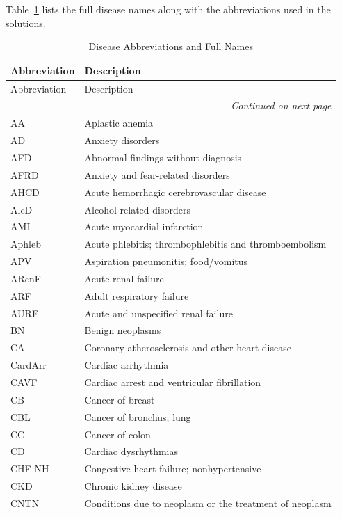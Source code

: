 Table~\ref{tab.abb} lists the full disease names along with the abbreviations used in the solutions.
{\scriptsize
\begin{longtable}{ll}

\toprule
{Abbreviation} & {Description} \\
\midrule
\endfirsthead

\toprule
{Abbreviation} & {Description} \\
\midrule
\endhead

\midrule
\multicolumn{2}{r}{\textit{Continued on next page}} \\
\endfoot

\bottomrule
\caption{\label{tab.abb} \normalsize{Disease Abbreviations and Full Names}}

\endlastfoot

AA & Aplastic anemia \\
AD & Anxiety disorders \\
AFD & Abnormal findings without diagnosis \\
AFRD & Anxiety and fear-related disorders \\
AHCD & Acute hemorrhagic cerebrovascular disease \\
AlcD & Alcohol-related disorders \\
AMI & Acute myocardial infarction \\
Aphleb & Acute phlebitis; thrombophlebitis and thromboembolism \\
APV & Aspiration pneumonitis; food/vomitus \\
ARenF & Acute renal failure \\
ARF & Adult respiratory failure \\
AURF & Acute and unspecified renal failure \\
BN & Benign neoplasms \\
CA & Coronary atherosclerosis and other heart disease \\
CardArr & Cardiac arrhythmia \\
CAVF & Cardiac arrest and ventricular fibrillation \\
CB & Cancer of breast \\
CBL & Cancer of bronchus; lung \\
CC & Cancer of colon \\
CD & Cardiac dysrhythmias \\
CHF-NH & Congestive heart failure; nonhypertensive \\
CKD & Chronic kidney disease \\
CNTN & Conditions due to neoplasm or the treatment of neoplasm \\

\end{longtable}}
